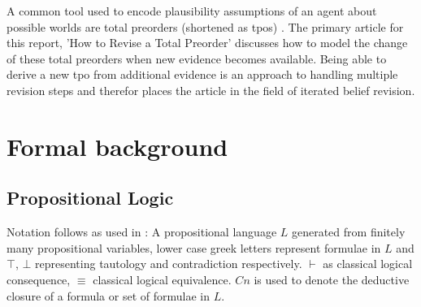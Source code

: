 \documentclass[11pt]{scrartcl}
\theoremstyle{definition}
\theoremstyle{definition}
\begin{document}

A common tool used to encode plausibility assumptions of an agent about possible worlds are total preorders (shortened as tpos) \cite{Booth2011}. The primary article for this report, 'How to Revise a Total Preorder' discusses how to model the change of these total preorders when new evidence becomes available. Being able to derive a new tpo from additional evidence is an approach to handling multiple revision steps and therefor places the article in the field of iterated belief revision.

\section{Formal background}

\subsection{Propositional Logic} %
Notation follows as used in \cite{Booth2011}: A propositional language $L$ generated from finitely many propositional variables, lower case greek letters represent formulae in $L$ and $\top$, $\bot$ representing tautology and contradiction respectively. $\vdash$ as classical logical consequence, $\equiv$ classical logical equivalence. $Cn$ is used to denote the deductive closure of a formula or set of formulae in $L$.
\end{document}
